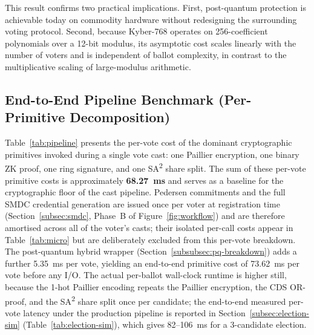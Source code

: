 This result confirms two practical implications. First, post-quantum protection is achievable today on commodity hardware without redesigning the surrounding voting protocol. Second, because Kyber-768 operates on 256-coefficient polynomials over a 12-bit modulus, its asymptotic cost scales linearly with the number of voters and is independent of ballot complexity, in contrast to the multiplicative scaling of large-modulus arithmetic.

\subsection{End-to-End Pipeline Benchmark (Per-Primitive Decomposition)}
\label{subsec:pipeline-bench}

Table~\ref{tab:pipeline} presents the per-vote cost of the dominant cryptographic primitives invoked during a single vote cast: one Paillier encryption, one binary ZK proof, one ring signature, and one SA\textsuperscript{2} share split. The sum of these per-vote primitive costs is approximately \textbf{68.27~ms} and serves as a baseline for the cryptographic floor of the cast pipeline. Pedersen commitments and the full SMDC credential generation are issued once per voter at registration time (Section~\ref{subsec:smdc}, Phase~B of Figure~\ref{fig:workflow}) and are therefore amortised across all of the voter's casts; their isolated per-call costs appear in Table~\ref{tab:micro} but are deliberately excluded from this per-vote breakdown. The post-quantum hybrid wrapper (Section~\ref{subsubsec:pq-breakdown}) adds a further 5.35~ms per vote, yielding an end-to-end primitive cost of 73.62~ms per vote before any I/O. The actual per-ballot wall-clock runtime is higher still, because the 1-hot Paillier encoding repeats the Paillier encryption, the CDS OR-proof, and the SA\textsuperscript{2} share split once per candidate; the end-to-end measured per-vote latency under the production pipeline is reported in Section~\ref{subsec:election-sim} (Table~\ref{tab:election-sim}), which gives 82--106~ms for a 3-candidate election.

